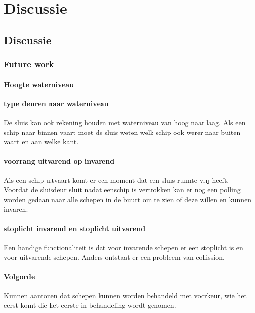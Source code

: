 \newpage
\chapter{Discussie}
\section{Discussie}
\subsection{Future work}
\subsubsection{Hoogte waterniveau}

\subsubsection{type deuren naar waterniveau}
De sluis kan ook rekening houden met waterniveau van hoog naar laag.
Als een schip naar binnen vaart moet de sluis weten welk schip ook werer naar buiten vaart en aan welke kant.

\subsubsection{voorrang uitvarend op invarend}
Als een schip uitvaart komt er een moment dat een sluis ruimte vrij heeft. Voordat de sluisdeur sluit nadat eenschip is vertrokken kan er nog een polling worden gedaan naar alle schepen in de buurt om te zien of deze willen en kunnen invaren.

\subsubsection{stoplicht invarend en stoplicht uitvarend}
Een handige functionaliteit is dat voor invarende schepen er een stoplicht is en voor uitvarende schepen. Anders ontstaat er een probleem van collission. 

\subsubsection{Volgorde}
Kunnen aantonen dat schepen kunnen worden behandeld met voorkeur, wie het eerst komt die het eerste in behandeling wordt genomen.